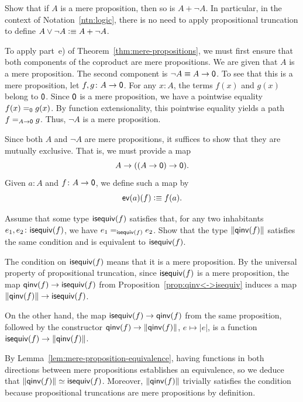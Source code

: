 \begin{exr}\fe\label{exr:A+negA-is-mere-proposition}
    Show that if\/ $A$ is a mere proposition, then so is\/ $A+\neg A$. In particular, in the context of\/ {\upshape Notation~\ref{ntn:logic}}, there is no need to apply propositional truncation to define\/ $A\lor\neg A\mathrel{\vcentcolon}\equiv A+\neg A$.
\end{exr}

\begin{solution}
    To apply part~e) of Theorem~\ref{thm:mere-propositions}, we must first ensure that both components of the coproduct are mere propositions. We are given that\/ $A$ is a mere proposition. The second component is\/ $\neg A\equiv A\to\mathsf{0}$. To see that this is a mere proposition, let\/ $f,g\colon A\to\fun0$. For any\/ $x\colon A$, the terms\/ $f(x)$ and\/ $g(x)$ belong to\/ $\mathsf{0}$. Since\/ $\mathsf{0}$ is a mere proposition, we have a pointwise equality\/ $f(x)\mathrel{=_{\mathsf{0}}}g(x)$. By function extensionality, this pointwise equality yields a path\/ $f\mathrel{=_{A\to\mathsf{0}}}g$. Thus,\/ $\neg A$ is a mere proposition.

    Since both\/ $A$ and\/ $\neg A$ are mere propositions, it suffices to show that they are mutually exclusive. That is, we must provide a map
    \[
        A\to((A\to\mathsf{0})\to\mathsf{0}).
    \]
    Given\/ $a\colon A$ and\/ $f\colon A\to\fun0$, we define such a map by
    \[
        \mathsf{ev}(a)(f)\mathrel{\vcentcolon}\equiv f(a).
    \]
\end{solution}

\begin{exr}\label{exr:when-isequiv-is-mere-proposition}
    Assume that some type\/ $\mathsf{isequiv}(f)$ satisfies that, for any two inhabitants\/ $e_1,e_2\colon\fun{isequiv}(f)$, we have\/ $e_1\mathrel{=_{\mathsf{isequiv}(f)}}e_2$. Show that the type\/ $\lVert\mathsf{qinv}(f)\rVert$ satisfies the same condition and is equivalent to\/ $\mathsf{isequiv}(f)$.
\end{exr}

\begin{solution}
    The condition on $\mathsf{isequiv}(f)$ means that it is a mere proposition. By the universal property of propositional truncation, since $\mathsf{isequiv}(f)$ is a mere proposition, the map $\mathsf{qinv}(f)\to\mathsf{isequiv}(f)$ from Proposition~\ref{prop:qinv<->isequiv} induces a map $\lVert\mathsf{qinv}(f)\rVert\to\mathsf{isequiv}(f)$.
    
    On the other hand, the map $\mathsf{isequiv}(f)\to\mathsf{qinv}(f)$ from the same proposition, followed by the constructor $\mathsf{qinv}(f)\to\lVert\mathsf{qinv}(f)\rVert$, $e\mapsto\lvert e\rvert$, is a function $\mathsf{isequiv}(f)\to\lVert\mathsf{qinv}(f)\rVert$.

    By Lemma~\ref{lem:mere-proposition-equivalence}, having functions in both directions between mere propositions establishes an equivalence, so we deduce that $\lVert\mathsf{qinv}(f)\rVert\simeq\mathsf{isequiv}(f)$. Moreover, $\lVert\mathsf{qinv}(f)\rVert$ trivially satisfies the condition because propositional truncations are mere propositions by definition.
\end{solution}

